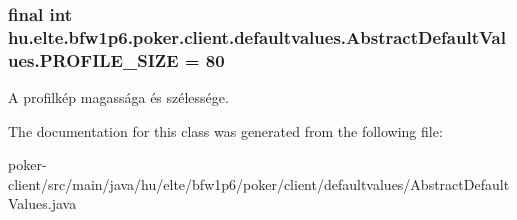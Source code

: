 \subsubsection[{P\+R\+O\+F\+I\+L\+E\+\_\+\+S\+I\+Z\+E}]{\setlength{\rightskip}{0pt plus 5cm}final int hu.\+elte.\+bfw1p6.\+poker.\+client.\+defaultvalues.\+Abstract\+Default\+Values.\+P\+R\+O\+F\+I\+L\+E\+\_\+\+S\+I\+Z\+E = 80}\label{classhu_1_1elte_1_1bfw1p6_1_1poker_1_1client_1_1defaultvalues_1_1_abstract_default_values_a84db9648ccdbbc7ec358714c14e5eda2}
A profilkép magassága és szélessége. 

The documentation for this class was generated from the following file\+:\begin{DoxyCompactItemize}
\item 
poker-\/client/src/main/java/hu/elte/bfw1p6/poker/client/defaultvalues/Abstract\+Default\+Values.\+java\end{DoxyCompactItemize}

